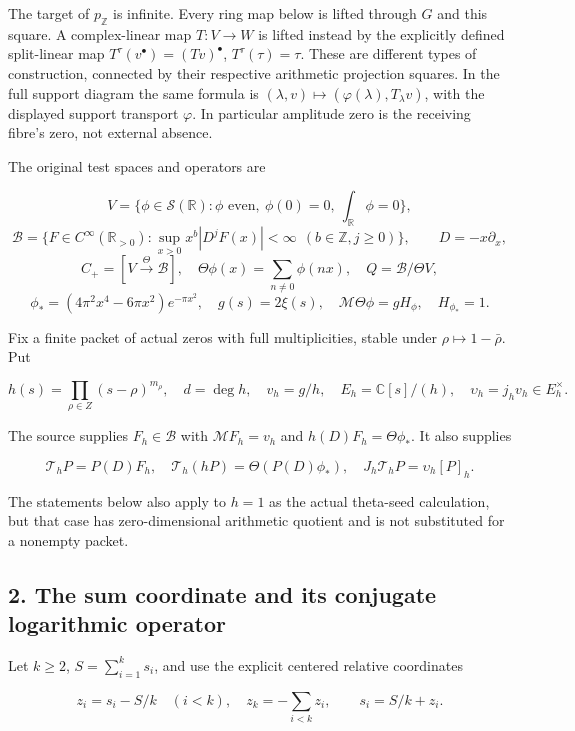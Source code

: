 \documentclass[
]{article}
\begin{document}
The target of \(p_{\mathbb Z}\) is infinite. Every ring map below is
lifted through \(G\) and this square. A complex-linear map \(T:V\to W\)
is lifted instead by the explicitly defined split-linear map
\(T^\tau(v^\bullet)=(Tv)^\bullet\), \(T^\tau(\tau)=\tau\). These are
different types of construction, connected by their respective
arithmetic projection squares. In the full support diagram the same
formula is \((\lambda,v)\mapsto(\varphi(\lambda),T_\lambda v)\), with
the displayed support transport \(\varphi\). In particular amplitude
zero is the receiving fibre's zero, not external absence.

The original test spaces and operators are

\[V=\{\phi\in\mathcal S(\mathbb R):\phi\text{ even},\ \phi(0)=0,\ \int_{\mathbb R}\phi=0\},\]
\[\mathscr B=\{F\in C^\infty(\mathbb R_{>0}):\sup_{x>0}x^b|D^jF(x)|<\infty\ \ (b\in\mathbb Z,j\ge0)\},\qquad D=-x\partial_x,\]
\[C_+=[V\xrightarrow{\Theta}\mathscr B],\quad \Theta\phi(x)=\sum_{n\ne0}\phi(nx),\quad Q=\mathscr B/\Theta V,\]
\[\phi_*=(4\pi^2x^4-6\pi x^2)e^{-\pi x^2},\quad g(s)=2\xi(s),\quad \mathcal M\Theta\phi=gH_\phi,\quad H_{\phi_*}=1.\tag{1.3}\]

Fix a finite packet of actual zeros with full multiplicities, stable
under \(\rho\mapsto1-\bar\rho\). Put

\[h(s)=\prod_{\rho\in Z}(s-\rho)^{m_\rho},\quad d=\deg h,\quad v_h=g/h,\quad E_h=\mathbb C[s]/(h),\quad \upsilon_h=j_hv_h\in E_h^\times.\tag{1.4}\]

The source supplies \(F_h\in\mathscr B\) with \(\mathcal MF_h=v_h\) and
\(h(D)F_h=\Theta\phi_*\). It also supplies

\[\mathcal T_hP=P(D)F_h,\quad \mathcal T_h(hP)=\Theta(P(D)\phi_*),\quad J_h\mathcal T_hP=\upsilon_h[P]_h.\tag{1.5}\]

The statements below also apply to \(h=1\) as the actual theta-seed
calculation, but that case has zero-dimensional arithmetic quotient and
is not substituted for a nonempty packet.

\subsection{2. The sum coordinate and its conjugate logarithmic
operator}\label{the-sum-coordinate-and-its-conjugate-logarithmic-operator}

Let \(k\ge2\), \(S=\sum_{i=1}^ks_i\), and use the explicit centered
relative coordinates

\[z_i=s_i-S/k\quad(i<k),\quad z_k=-\sum_{i<k}z_i,\qquad s_i=S/k+z_i.\tag{2.1}\]
\end{document}
